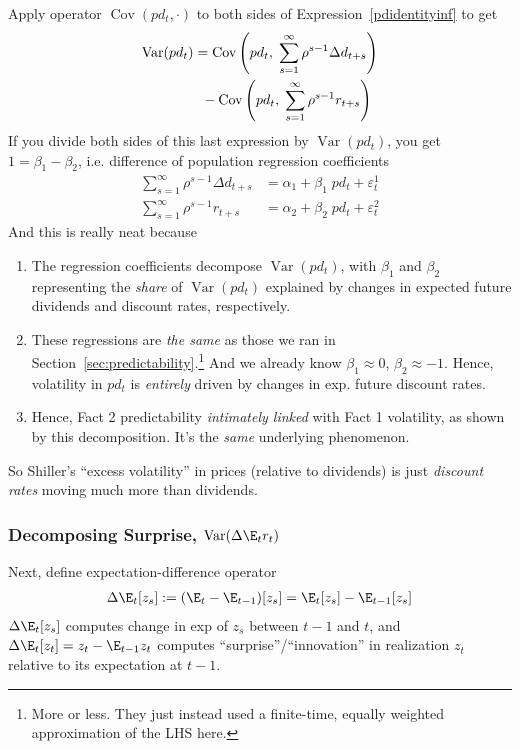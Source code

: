 \documentclass[12pt]{article}
\theoremstyle{plain}
\theoremstyle{definition}
\theoremstyle{remark}
\newcommand{\Cov}{\operatorname{Cov}}
\newcommand{\Var}{\operatorname{Var}}
\begin{document}
\begin{multicols*}{2}
Apply operator $\Cov(pd_t,\cdot)$ to both sides of
Expression~\ref{pdidentityinf} to get
\begin{align}
  \Var(pd_t)
  &=
  \Cov\left(
    pd_t,\;
    \sum_{s=1}^\infty \rho^{s-1}\Delta d_{t+s}
  \right)
  \notag
  \\
  &\;\;
  -
  \Cov\left(
    pd_t,\;
    \sum_{s=1}^\infty \rho^{s-1}r_{t+s}
  \right)
  \notag
\end{align}
If you divide both sides of this last expression by $\Var(pd_t)$,
you get $1=\beta_{1}-\beta_{2}$, i.e. difference of population
regression coefficients
\begin{align*}
  \sum_{s=1}^\infty \rho^{s-1}\Delta d_{t+s}
  &= \alpha_{1} + \beta_{1}\; pd_t
  + \varepsilon^{1}_t
  \\
  \sum_{s=1}^\infty \rho^{s-1}r_{t+s}
  &= \alpha_{2} + \beta_{2}\; pd_t + \varepsilon^2_t
\end{align*}
And this is really neat because
\begin{enumerate}
  \item
    The regression coefficients decompose $\Var(pd_t)$, with
    $\beta_{1}$ and $\beta_2$ representing the \emph{share} of
    $\Var(pd_t)$ explained by changes in expected future dividends and
    discount rates, respectively.

  \item
    These regressions are \emph{the same} as those we ran
    in Section~\ref{sec:predictability}.\footnote{%
      More or less.
      They just instead used a finite-time, equally weighted
      approximation of the LHS here.
    }
    And we already know $\beta_{1}\approx 0$, $\beta_2\approx -1$.
    Hence, volatility in $pd_t$ is \emph{entirely} driven by changes in
    exp. future discount rates.

  \item
    Hence, Fact 2 predictability \emph{intimately linked} with Fact 1
    volatility, as shown by this decomposition.
    It's the \emph{same} underlying phenomenon.
\end{enumerate}
So Shiller's ``excess volatility'' in prices (relative to
dividends) is just \emph{discount rates} moving much more than
dividends.

\subsubsection{Decomposing Surprise, $\Var(\Delta \E_t r_t)$}
\label{sec:decompsur}

Next, define expectation-difference operator
\begin{align*}
  \Delta \E_t[z_s]
  := (\E_t - \E_{t-1})[z_s]
  = \E_t[z_s] - \E_{t-1}[z_s]
\end{align*}
$\Delta\E_t[z_s]$ computes change in exp of $z_s$ between $t-1$ and $t$,
and $\Delta \E_t[z_t]=z_t-\E_{t-1}z_t$ computes
``surprise''/``innovation'' in realization $z_t$ relative to its
expectation at $t-1$.


\end{multicols*}
\end{document}
